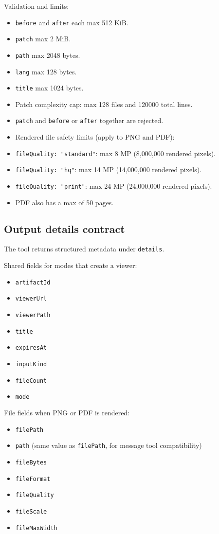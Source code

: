 Validation and limits:

\begin{itemize}
  \item \texttt{before} and \texttt{after} each max 512 KiB.
  \item \texttt{patch} max 2 MiB.
  \item \texttt{path} max 2048 bytes.
  \item \texttt{lang} max 128 bytes.
  \item \texttt{title} max 1024 bytes.
  \item Patch complexity cap: max 128 files and 120000 total lines.
  \item \texttt{patch} and \texttt{before} or \texttt{after} together are rejected.
  \item Rendered file safety limits (apply to PNG and PDF):
  \item \texttt{fileQuality: "standard"}: max 8 MP (8,000,000 rendered pixels).
  \item \texttt{fileQuality: "hq"}: max 14 MP (14,000,000 rendered pixels).
  \item \texttt{fileQuality: "print"}: max 24 MP (24,000,000 rendered pixels).
  \item PDF also has a max of 50 pages.
\end{itemize}


\subsection{Output details contract}


The tool returns structured metadata under \texttt{details}.

Shared fields for modes that create a viewer:

\begin{itemize}
  \item \texttt{artifactId}
  \item \texttt{viewerUrl}
  \item \texttt{viewerPath}
  \item \texttt{title}
  \item \texttt{expiresAt}
  \item \texttt{inputKind}
  \item \texttt{fileCount}
  \item \texttt{mode}
\end{itemize}


File fields when PNG or PDF is rendered:

\begin{itemize}
  \item \texttt{filePath}
  \item \texttt{path} (same value as \texttt{filePath}, for message tool compatibility)
  \item \texttt{fileBytes}
  \item \texttt{fileFormat}
  \item \texttt{fileQuality}
  \item \texttt{fileScale}
  \item \texttt{fileMaxWidth}
\end{itemize}


